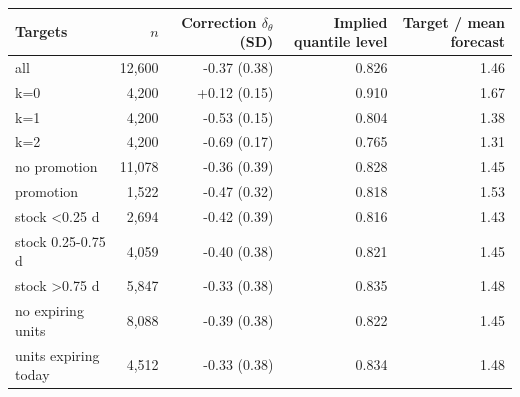 \begin{tabular}{lrrrr}
\toprule
Targets & $n$ & Correction $\delta_\theta$ (SD) & Implied quantile level & Target / mean forecast \\
\midrule
all & 12,600 & -0.37 (0.38) & 0.826 & 1.46 \\
k=0 & 4,200 & +0.12 (0.15) & 0.910 & 1.67 \\
k=1 & 4,200 & -0.53 (0.15) & 0.804 & 1.38 \\
k=2 & 4,200 & -0.69 (0.17) & 0.765 & 1.31 \\
no promotion & 11,078 & -0.36 (0.39) & 0.828 & 1.45 \\
promotion & 1,522 & -0.47 (0.32) & 0.818 & 1.53 \\
stock <0.25 d & 2,694 & -0.42 (0.39) & 0.816 & 1.43 \\
stock 0.25-0.75 d & 4,059 & -0.40 (0.38) & 0.821 & 1.45 \\
stock >0.75 d & 5,847 & -0.33 (0.38) & 0.835 & 1.48 \\
no expiring units & 8,088 & -0.39 (0.38) & 0.822 & 1.45 \\
units expiring today & 4,512 & -0.33 (0.38) & 0.834 & 1.48 \\
\bottomrule
\end{tabular}
